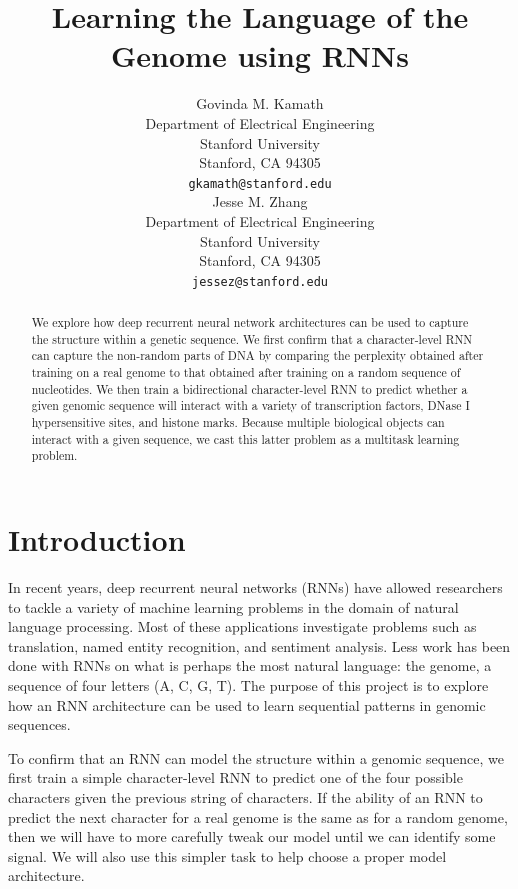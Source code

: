 \documentclass{article} %
\title{Learning the Language of the Genome using RNNs}
\author{
Govinda M. Kamath \\
Department of Electrical Engineering\\
Stanford University\\
Stanford, CA 94305 \\
\texttt{gkamath@stanford.edu} \\
\And
Jesse M. Zhang \\
Department of Electrical Engineering \\
Stanford University \\
Stanford, CA 94305 \\
\texttt{jessez@stanford.edu} \\
}
\begin{document}
\maketitle

\begin{abstract}
We explore how deep recurrent neural network architectures can be used to capture the structure within a genetic sequence. We first confirm that a character-level RNN can capture the non-random parts of DNA by comparing the perplexity obtained after training on a real genome to that obtained after training on a random sequence of nucleotides. We then train a bidirectional character-level RNN to predict whether a given genomic sequence will interact with a variety of transcription factors, DNase I hypersensitive sites, and histone marks. Because multiple biological objects can interact with a given sequence, we cast this latter problem as a multitask learning problem.
\end{abstract}

\section{Introduction}
In recent years, deep recurrent neural networks (RNNs) have allowed researchers to tackle a variety of machine learning problems in the domain of natural language processing. Most of these applications investigate problems such as translation, named entity recognition, and sentiment analysis. Less work has been done with RNNs on what is perhaps the most natural language: the genome, a sequence of four letters (A, C, G, T). The purpose of this project is to explore how an RNN architecture can be used to learn sequential patterns in genomic sequences.

To confirm that an RNN can model the structure within a genomic sequence, we first train a simple character-level RNN to predict one of the four possible characters given the previous string of characters. If the ability of an RNN to predict the next character for a real genome is the same as for a random genome, then we will have to more carefully tweak our model until we can identify some signal. We will also use this simpler task to help choose a proper model architecture.
\end{document}
